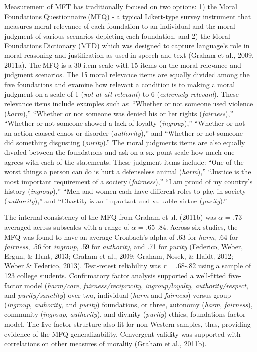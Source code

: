 \documentclass[
  man,floatsintext]{apa6}
\begin{document}
Measurement of MFT has traditionally focused on two options: 1) the
Moral Foundations Questionnaire (MFQ) - a typical Likert-type survey
instrument that measures moral relevance of each foundation to an
individual and the moral judgment of various scenarios depicting each
foundation, and 2) the Moral Foundations Dictionary (MFD) which was
designed to capture language's role in moral reasoning and justification
as used in speech and text (Graham et al., 2009, 2011a). The MFQ is a
30-item scale with 15 items on the moral relevance and judgment
scenarios. The 15 moral relevance items are equally divided among the
five foundations and examine how relevant a condition is to making a
moral judgment on a scale of 1 (\emph{not at all relevant}) to 6 (\emph{extremely
relevant}). These relevance items include examples such as: ``Whether or
not someone used violence (\emph{harm}),'' ``Whether or not someone was denied
his or her rights (\emph{fairness}),'' ``Whether or not someone showed a lack
of loyalty (\emph{ingroup}),'' ``Whether or not an action caused chaos or
disorder (\emph{authority}),'' and ``Whether or not someone did something
disgusting (\emph{purity}).'' The moral judgments items are also equally
divided between the foundations and ask on a six-point scale how much
one agrees with each of the statements. These judgment items include:
``One of the worst things a person can do is hurt a defenseless animal
(\emph{harm}),'' ``Justice is the most important requirement of a society
(\emph{fairness}),'' ``I am proud of my country's history (\emph{ingroup}),'' ``Men
and women each have different roles to play in society (\emph{authority}),''
and ``Chastity is an important and valuable virtue (\emph{purity}).''

The internal consistency of the MFQ from Graham et al. (2011b) was \(\alpha\) = .73
averaged across subscales with a range of \(\alpha\) = .65-.84. Across six
studies, the MFQ was found to have an average Cronbach's alpha of .63
for \emph{harm}, .64 for \emph{fairness}, .56 for \emph{ingroup}, .59 for \emph{authority},
and .71 for \emph{purity} (Federico, Weber, Ergun, \& Hunt, 2013; Graham et al., 2009; Graham, Nosek, \& Haidt, 2012; Weber \& Federico, 2013). Test-retest reliability was \emph{r} = .68-.82 using a sample of
123 college students. Confirmatory factor analysis supported a
well-fitted five-factor model (\emph{harm/care}, \emph{fairness/reciprocity},
\emph{ingroup/loyalty}, \emph{authority/respect}, and \emph{purity/sanctity}) over two,
individual (\emph{harm} and \emph{fairness}) versus group (\emph{ingroup}, \emph{authority},
and \emph{purity}) foundations, or three, autonomy (\emph{harm}, \emph{fairness}),
community (\emph{ingroup}, \emph{authority}), and divinity (\emph{purity}) ethics,
foundations factor model. The five-factor structure also fit for
non-Western samples, thus, providing evidence of the MFQ
generalizability. Convergent validity was supported with correlations on
other measures of morality (Graham et al., 2011b).
\end{document}
